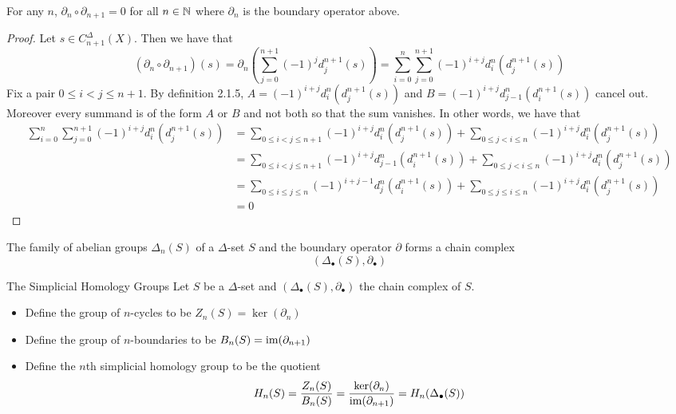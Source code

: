 \documentclass[a4paper]{article}
\begin{document}
\begin{prp}{}{} For any $n$, $\partial_n\circ\partial_{n+1}=0$ for all $n\in\mathbb{N}$ where $\partial_n$ is the boundary operator above. \tcbline
\begin{proof}
Let $s\in C_{n+1}^\Delta(X)$. Then we have that $$(\partial_n\circ\partial_{n+1})(s)=\partial_n\left(\sum_{j=0}^{n+1}(-1)^jd_j^{n+1}(s)\right)=\sum_{i=0}^n\sum_{j=0}^{n+1}(-1)^{i+j}d_i^n(d_j^{n+1}(s))$$ Fix a pair $0\leq i<j\leq n+1$. By definition 2.1.5, $A=(-1)^{i+j}d_i^n(d_j^{n+1}(s))$ and $B=(-1)^{i+j}d_{j-1}^n(d_i^{n+1}(s))$ cancel out. Moreover every summand is of the form $A$ or $B$ and not both so that the sum vanishes. In other words, we have that 
\begin{align*}
\sum_{i=0}^n\sum_{j=0}^{n+1}(-1)^{i+j}d_i^n(d_j^{n+1}(s))&=\sum_{0\leq i<j\leq n+1}(-1)^{i+j}d_i^n(d_j^{n+1}(s))+\sum_{0\leq j<i\leq n}(-1)^{i+j}d_i^n(d_j^{n+1}(s))\\
&=\sum_{0\leq i<j\leq n+1}(-1)^{i+j}d_{j-1}^n(d_i^{n+1}(s))+\sum_{0\leq j<i\leq n}(-1)^{i+j}d_i^n(d_j^{n+1}(s))\\
&=\sum_{0\leq i\leq j\leq n}(-1)^{i+j-1}d_j^n(d_i^{n+1}(s))+\sum_{0\leq j\leq i\leq n}(-1)^{i+j}d_i^n(d_j^{n+1}(s))\\
&=0
\end{align*}
\end{proof}
\end{prp}

\begin{crl}{}{} The family of abelian groups $\Delta_n(S)$ of a $\Delta$-set $S$ and the boundary operator $\partial$ forms a chain complex $$(\Delta_\bullet(S),\partial_\bullet)$$
\end{crl}

\begin{defn}{The Simplicial Homology Groups}{} Let $S$ be a $\Delta$-set and $(\Delta_\bullet(S),\partial_\bullet)$ the chain complex of $S$. 
\begin{itemize}
\item Define the group of $n$-cycles to be $Z_n(S)=\ker(\partial_n)$
\item Define the group of $n$-boundaries to be $B_n(S)=\operatorname{im}(\partial_{n+1})$
\item Define the $n$th simplicial homology group to be the quotient $$H_n(S)=\frac{Z_n(S)}{B_n(S)}=\frac{\ker(\partial_n)}{\operatorname{im}(\partial_{n+1})}=H_n(\Delta_\bullet(S))$$
\end{itemize}
\end{defn}
\end{document}
